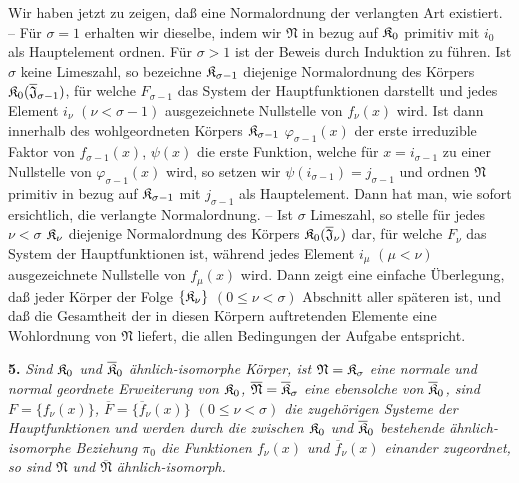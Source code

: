 Wir haben jetzt zu zeigen, daß eine Normalordnung der verlangten Art existiert. -- Für $\sigma=1$ erhalten wir dieselbe, indem wir $\mathfrak N$ in bezug auf $\mathfrak K_0$ primitiv mit $i_0$ als Hauptelement ordnen. Für $\sigma>1$ ist der Beweis durch Induktion zu führen. Ist $\sigma$ keine Limeszahl, so bezeichne $\mathfrak K_{\sigma-1}$ diejenige Normalordnung des Körpers $\mathfrak K_0(\overline{\mathfrak J}_{\sigma-1})$, für welche $F_{\sigma-1}$ das System der Hauptfunktionen darstellt und jedes Element $i_\nu$ $(\nu<\sigma-1)$ ausgezeichnete Nullstelle von $f_\nu(x)$ wird. Ist dann innerhalb des wohlgeordneten Körpers $\mathfrak K_{\sigma-1}$ $\varphi_{\sigma-1}(x)$ der erste irreduzible Faktor von $f_{\sigma-1}(x)$, $\psi(x)$ die erste Funktion, welche für $x=i_{\sigma-1}$ zu einer Nullstelle von $\varphi_{\sigma-1}(x)$ wird, so setzen wir $\psi(i_{\sigma-1})=j_{\sigma-1}$ und ordnen $\mathfrak N$ primitiv in bezug auf $\mathfrak K_{\sigma-1}$ mit $j_{\sigma-1}$ als Hauptelement. Dann hat man, wie sofort ersichtlich, die verlangte Normalordnung. -- Ist $\sigma$ Limeszahl, so stelle für jedes $\nu<\sigma$ $\mathfrak K_\nu$ diejenige Normalordnung des Körpers $\mathfrak K_0(\overline{\mathfrak J}_\nu)$ dar, für welche $F_\nu$ das System der Hauptfunktionen ist, während jedes Element $i_\mu$ $(\mu<\nu)$ ausgezeichnete Nullstelle von $f_\mu(x)$ wird. Dann zeigt eine einfache Überlegung, daß jeder Körper der Folge $\{\mathfrak K_\nu\}$ $(0\leq\nu<\sigma)$ Abschnitt aller späteren ist, und daß die Gesamtheit der in diesen Körpern auftretenden Elemente eine Wohlordnung von $\mathfrak N$ liefert, die allen Bedingungen der Aufgabe entspricht.

\textbf{5.} \emph{Sind $\mathfrak K_0$ und $\overline{\mathfrak K}_0$ ähnlich-isomorphe Körper, ist $\mathfrak N=\mathfrak K_\sigma$ eine normale und normal geordnete Erweiterung von $\mathfrak K_0$, $\overline{\mathfrak N}=\overline{\mathfrak K}_\sigma$ eine ebensolche von $\overline{\mathfrak K}_0$, sind $F=\{f_\nu(x)\}$, $\overline F=\{\overline f_\nu(x)\}$ $(0\leq\nu<\sigma)$ die zugehörigen Systeme der Hauptfunktionen und werden durch die zwischen $\mathfrak K_0$ und $\overline{\mathfrak K}_0$ bestehende ähnlich-isomorphe Beziehung $\pi_0$ die Funktionen $f_\nu(x)$ und $\overline f_\nu(x)$ einander zugeordnet, so sind $\mathfrak N$ und $\overline{\mathfrak N}$ ähnlich-isomorph.}

